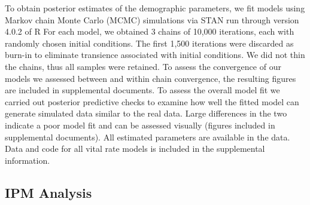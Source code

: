 \documentclass[11pt]{article}
\newcommand{\tom}[2]{{\color{red}{#1}}\footnote{\textit{\color{red}{#2}}}}
\begin{document}
To obtain posterior estimates of the demographic parameters, we fit models using Markov chain Monte Carlo (MCMC) simulations via STAN run through version 4.0.2 of R %
For each model, we obtained 3 chains of 10,000 iterations, each with randomly chosen initial conditions. 
The first 1,500 iterations were discarded as burn-in to eliminate transience associated with initial conditions. 
We did not thin the chains, thus all samples were retained. 
To assess the convergence of our models we assessed between and within chain convergence, the resulting figures are included in supplemental documents. 
To assess the overall model fit we carried out posterior predictive checks to examine how well the fitted model can generate simulated data similar to the real data.
Large differences in the two indicate a poor model fit and can be assessed visually (figures included in supplemental documents). 
All estimated parameters are available in the data. 
Data and code for all vital rate models is included in the supplemental information.

\subsection*{IPM Analysis}
\end{document}
